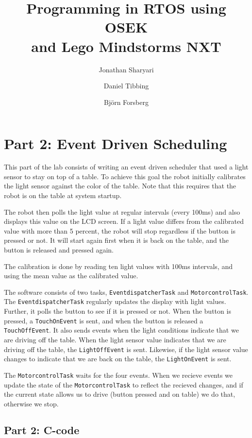 \documentclass[a4paper,10pt]{report}
\title{\textbf{Programming in RTOS using OSEK\\ and Lego Mindstorms NXT}}
\author{Jonathan Sharyari \and Daniel Tibbing \and Bj{\"o}rn Forsberg}
\begin{document}
\maketitle

\section*{Part 2: Event Driven Scheduling}

This part of the lab consists of writing an event driven scheduler that used a light sensor to stay on top of a table. To achieve this goal the robot initially  calibrates the light sensor against the color of the table. Note that this requires that the robot is on the table at system startup. 

The robot then polls the light value at regular intervals (every 100ms) and also displays this value on the LCD screen. If a light value differs from the calibrated value with more than 5 percent, the robot will stop regardless if the button is pressed or not. It will start again first when it is back on the table, and the button is released and pressed again.

The calibration is done by reading ten light values with 100ms intervals, and using the mean value as the calibrated value.

The software consists of two tasks, \texttt{EventdispatcherTask} and \texttt{MotorcontrolTask}. The \texttt{EventdispatcherTask} regularly updates the display with light values. Further, it polls the button to see if it is pressed or not. When the button is pressed, a \texttt{TouchOnEvent} is sent, and when the button is released a \texttt{TouchOffEvent}. It also sends events when the light conditions indicate that we are driving off the table. When the light sensor value indicates that we are driving off the table, the \texttt{LightOffEvent} is sent. Likewise, if the light sensor value changes to indicate that we are back on the table, the \texttt{LightOnEvent} is sent.

The \texttt{MotorcontrolTask} waits for the four events. When we recieve events we update the state of the \texttt{MotorcontrolTask} to reflect the recieved changes, and if the current state allows us to drive (button pressed and on table) we do that, otherwise we stop.


\appendix
\subsection*{Part 2: C-code}
\end{document}
